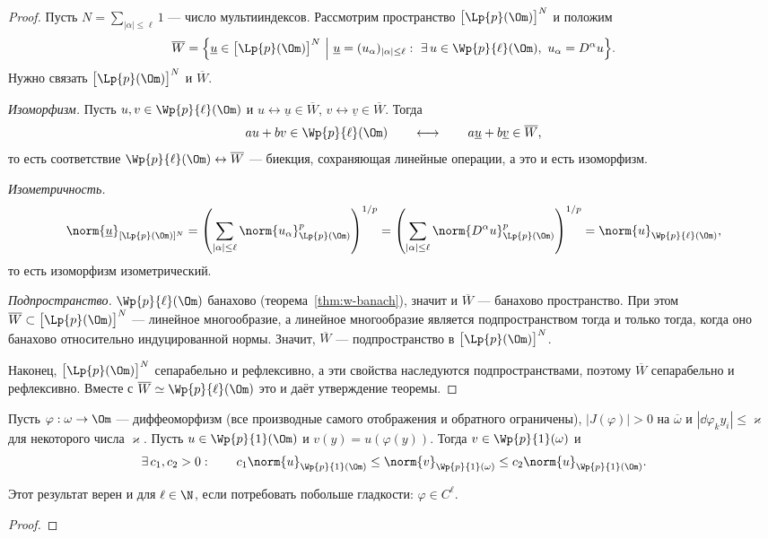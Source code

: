 \begin{proof}
Пусть $N = \sum_{|\alpha| \le \ell} 1$ — число мультииндексов. Рассмотрим
пространство $\big[\Lp{p}(\Om)\big]^N$ и положим
\[
  \overline{W} = \Big\{ \underline{u} \in \big[\Lp{p}(\Om)\big]^N
  \ \Big|\ \underline{u} = (u_\alpha)_{|\alpha| \le \ell}:
  \ \exists\, u \in \Wp{p}{\ell}(\Om), \ u_\alpha = D^\alpha u \Big\} .
\]
Нужно связать $\big[\Lp{p}(\Om)\big]^N$ и $\overline{W}$.

\emph{Изоморфизм.} Пусть $u, v \in \Wp{p}{\ell}(\Om)$ и
$u \leftrightarrow \underline{u} \in \overline{W}$,
$v \leftrightarrow \underline{v} \in \overline{W}$. Тогда
\[
  a u + b v \in \Wp{p}{\ell}(\Om)
  \qquad\longleftrightarrow\qquad
  a \underline{u} + b \underline{v} \in \overline{W} ,
\]
то есть соответствие $\Wp{p}{\ell}(\Om) \leftrightarrow \overline{W}$ — биекция,
сохраняющая линейные операции, а это и есть изоморфизм.

\emph{Изометричность.}
\[
  \norm{\underline{u}}_{[\Lp{p}(\Om)]^N}
  = \left( \sum_{|\alpha| \le \ell} \norm{u_\alpha}^p_{\Lp{p}(\Om)} \right)^{1/p}
  = \left( \sum_{|\alpha| \le \ell} \norm{D^\alpha u}^p_{\Lp{p}(\Om)} \right)^{1/p}
  = \norm{u}_{\Wp{p}{\ell}(\Om)} ,
\]
то есть изоморфизм изометрический.

\emph{Подпространство.} $\Wp{p}{\ell}(\Om)$ банахово (теорема~\ref{thm:w-banach}),
значит и $\overline{W}$ — банахово пространство. При этом
$\overline{W} \subset \big[\Lp{p}(\Om)\big]^N$ — линейное многообразие, а линейное
многообразие является подпространством тогда и только тогда, когда оно банахово
относительно индуцированной нормы. Значит, $\overline{W}$ — подпространство
в $\big[\Lp{p}(\Om)\big]^N$.

Наконец, $\big[\Lp{p}(\Om)\big]^N$ сепарабельно и рефлексивно, а эти свойства
наследуются подпространствами, поэтому $\overline{W}$ сепарабельно и рефлексивно.
Вместе с $\overline{W} \simeq \Wp{p}{\ell}(\Om)$ это и даёт утверждение теоремы.
\end{proof}

\begin{theorem}\label{thm:w-change}
Пусть $\varphi : \omega \to \Om$ — диффеоморфизм (все производные самого отображения
и обратного ограничены), $|J(\varphi)| > 0$ на $\overline{\omega}$ и
$\left| \dd{\varphi_k}{y_i} \right| \le \varkappa$ для некоторого числа $\varkappa$.
Пусть $u \in \Wp{p}{1}(\Om)$ и $v(y) = u(\varphi(y))$. Тогда $v \in \Wp{p}{1}(\omega)$ и
\[
  \exists\, c_1, c_2 > 0: \qquad
  c_1 \norm{u}_{\Wp{p}{1}(\Om)} \le \norm{v}_{\Wp{p}{1}(\omega)}
  \le c_2 \norm{u}_{\Wp{p}{1}(\Om)} .
\]
\end{theorem}

\begin{remark}
Этот результат верен и для $\ell \in \N$, если потребовать побольше гладкости:
$\varphi \in C^\ell$.
\end{remark}

\begin{proof}
\plusplus
\end{proof}
